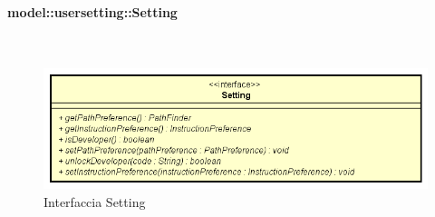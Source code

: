 \documentclass[../DefinizioneDiProdotto.tex]{subfiles}
\begin{document}
\paragraph{model::usersetting::Setting}
\
\begin{figure}[H]
	\centering
	\includegraphics[width=\maxwidth]{img/Setting.png}
	\caption{Interfaccia Setting}\label{fig:model::usersetting::Setting} 
\end{figure}
\end{document}

